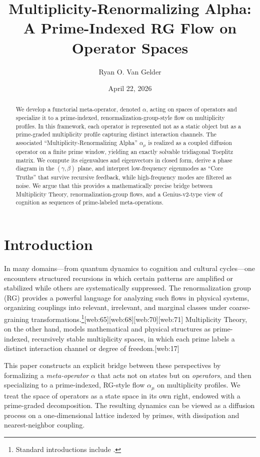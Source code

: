 \documentclass[11pt]{article}
\title{Multiplicity-Renormalizing Alpha: \\
A Prime-Indexed RG Flow on Operator Spaces}
\author[1]{Ryan O. Van Gelder}
\affil[1]{Citizen Gardens \\ The Foundation of Multiplicity}
\date{April 22, 2026}
\begin{document}
\maketitle

\begin{abstract}
We develop a functorial meta-operator, denoted $\alpha$, acting on spaces of operators and specialize it to a prime-indexed, renormalization-group-style flow on multiplicity profiles.
In this framework, each operator is represented not as a static object but as a prime-graded multiplicity profile capturing distinct interaction channels.
The associated ``Multiplicity-Renormalizing Alpha'' $\alpha_\mu$ is realized as a coupled diffusion operator on a finite prime window, yielding an exactly solvable tridiagonal Toeplitz matrix.
We compute its eigenvalues and eigenvectors in closed form, derive a phase diagram in the $(\gamma,\beta)$ plane, and interpret low-frequency eigenmodes as ``Core Truths'' that survive recursive feedback, while high-frequency modes are filtered as noise.
We argue that this provides a mathematically precise bridge between Multiplicity Theory, renormalization-group flows, and a Genius-v2-type view of cognition as sequences of prime-labeled meta-operations.
\end{abstract}
\newpage
\tableofcontents
\section{Introduction}

In many domains---from quantum dynamics to cognition and cultural cycles---one encounters structured recursions in which certain patterns are amplified or stabilized while others are systematically suppressed.
The renormalization group (RG) provides a powerful language for analyzing such flows in physical systems, organizing couplings into relevant, irrelevant, and marginal classes under coarse-graining transformations.\footnote{Standard introductions include \cite{Goldenfeld1992,TongRG,LPTMCRG,ERGReview}.}[web:65][web:68][web:70][web:71]
Multiplicity Theory, on the other hand, models mathematical and physical structures as prime-indexed, recursively stable multiplicity spaces, in which each prime labels a distinct interaction channel or degree of freedom.[web:17]

This paper constructs an explicit bridge between these perspectives by formalizing a \emph{meta-operator} $\alpha$ that acts not on states but on \emph{operators}, and then specializing to a prime-indexed, RG-style flow $\alpha_\mu$ on multiplicity profiles.
We treat the space of operators as a state space in its own right, endowed with a prime-graded decomposition.
The resulting dynamics can be viewed as a diffusion process on a one-dimensional lattice indexed by primes, with dissipation and nearest-neighbor coupling.
\end{document}
